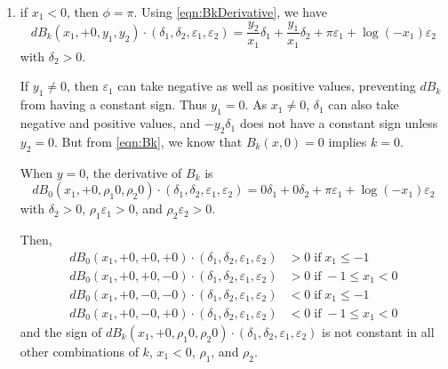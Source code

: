 \documentclass {article}
\renewcommand {\epsilon}{\varepsilon}
\renewcommand {\leq}{\leqslant}
\begin{document}
\begin {enumerate}
\begin {enumerate}
\begin {enumerate}
    \item If $y_2 \neq 0$, then $x_1 = \exp\left(\frac{k}{2y_2}\pi\right)$
      is a dyadic number only if $k=0$ and then $x_1=1$.
      We have, using \ref {eqn:BkDerivative},
      \[
      dB_0(+1, +0, y_1, y_2)\cdot(\delta_1, \delta_2, \epsilon_1,
      \epsilon_2) = y_2 \delta_1 + y_1 \delta_2 + 0 \epsilon_1 + 0
      \epsilon_2
      \]
      with $\delta_2 > 0$.

      But here $y_2 \delta_1$ can take negative as well as positive values
      preventing the sign of $dB_0(+1, +0, y_1, y_2)\cdot(\delta_1,
      \delta_2, \epsilon_1, \epsilon_2)$ from being constant.
    \end {enumerate}

  \item if $x_1 < 0$, then $\phi = \pi$.
    Using \ref {eqn:BkDerivative}, we have
    \[
    dB_k(x_1, +0, y_1, y_2)\cdot(\delta_1, \delta_2, \epsilon_1, \epsilon_2)
    = \frac{y_2}{x_1} \delta_1 + \frac{y_1}{x_1} \delta_2 + \pi \epsilon_1 +
    \log(-x_1) \epsilon_2
    \]
    with $\delta_2 > 0$.

    If $y_1 \neq 0$, then $\epsilon_1$ can take negative as well as positive
    values, preventing $dB_k$ from having a constant sign.
    Thus $y_1 = 0$.
    As $x_1 \neq 0$, $\delta_1$ can also take negative and positive values,
    and $-y_2 \delta_1$ does not have a constant sign unless $y_2 = 0$.
    But from \ref {eqn:Bk}, we know that $B_k(x, 0)=0$ implies $k = 0$.

    When $y = 0$, the derivative of $B_k$ is
    \[
    dB_0(x_1, +0, \rho_1 0, \rho_2 0)\cdot(\delta_1, \delta_2, \epsilon_1,
    \epsilon_2) = 0 \delta_1 + 0 \delta_2 + \pi \epsilon_1 + \log(-x_1)
    \epsilon_2
    \]
    with $\delta_2 >0$, $\rho_1 \epsilon_1 >0$, and $\rho_2 \epsilon_2 >0$.

    Then,
    \begin {align*}
      dB_0(x_1, +0, +0, +0)\cdot(\delta_1, \delta_2, \epsilon_1,
      \epsilon_2) &> 0 \;\text{if}\; x_1 \leq -1 \\
      dB_0(x_1, +0, +0, -0)\cdot(\delta_1, \delta_2, \epsilon_1,
      \epsilon_2) &> 0 \;\text{if}\; -1 \leq x_1 < 0 \\
      dB_0(x_1, +0, -0, -0)\cdot(\delta_1, \delta_2, \epsilon_1,
      \epsilon_2) &< 0 \;\text{if}\; x_1 \leq -1\\
      dB_0(x_1, +0, -0, +0)\cdot(\delta_1, \delta_2, \epsilon_1,
      \epsilon_2) &< 0 \;\text{if}\; -1 \leq x_1 < 0
    \end {align*}
    and the sign of $dB_k(x_1, +0, \rho_1 0, \rho_2 0)\cdot(\delta_1,
    \delta_2, \epsilon_1, \epsilon_2)$ is not constant in all other
    combinations of $k$, $x_1<0$, $\rho_1$, and $\rho_2$.
  \end {enumerate}


\end{enumerate}
\end{document}
